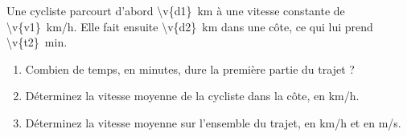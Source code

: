 Une cycliste parcourt d'abord \qty{\v{d1}}{km} à une vitesse constante de \qty{\v{v1}}{km/h}. Elle fait ensuite \qty{\v{d2}}{km} dans une côte, ce qui lui prend \qty{\v{t2}}{min}.

\begin{enumerate}[label=\alph*)]
    \item Combien de temps, en minutes, dure la première partie du trajet ?
    \item Déterminez la vitesse moyenne de la cycliste dans la côte, en km/h.
    \item Déterminez la vitesse moyenne sur l'ensemble du trajet, en km/h et en m/s.
\end{enumerate}
